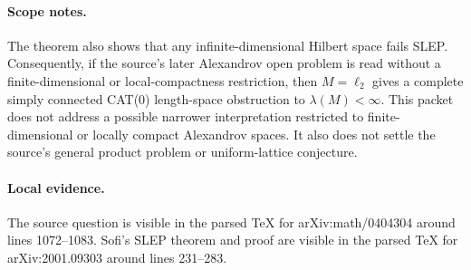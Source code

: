 \documentclass[11pt]{article}
\begin{document}
\paragraph{Scope notes.}
The theorem also shows that any infinite-dimensional Hilbert space fails SLEP.  Consequently, if the source's later Alexandrov open problem is read without a finite-dimensional or local-compactness restriction, then \(M=\ell_2\) gives a complete simply connected CAT(0) length-space obstruction to \(\lambda(M)<\infty\).  This packet does not address a possible narrower interpretation restricted to finite-dimensional or locally compact Alexandrov spaces.  It also does not settle the source's general product problem or uniform-lattice conjecture.

\paragraph{Local evidence.}
The source question is visible in the parsed TeX for arXiv:math/0404304 around lines 1072--1083.  Sofi's SLEP theorem and proof are visible in the parsed TeX for arXiv:2001.09303 around lines 231--283.
\end{document}
